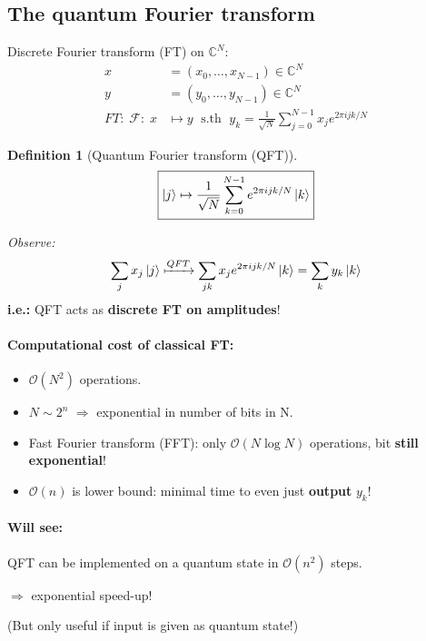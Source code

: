 \documentclass[a4paper, 12pt]{article}
\theoremstyle{plain}
\theoremstyle{definition}
\newtheorem*{definition}{Definition}
\theoremstyle{remark}
\begin{document}
\subsection{The quantum Fourier transform}

Discrete Fourier transform (FT) on $\mathbb{C}^N$:
\begin{align*}
  x&=(x_0,\ldots,x_{N-1}) \in \mathbb{C}^N \\
  y&=(y_0,\ldots,y_{N-1}) \in \mathbb{C}^N\\
  FT:\;\mathcal{F}:\;x &\mapsto y\; \text{ s.th }\; y_k = \frac{1}{\sqrt{N}}\sum_{j=0}^{N-1}x_je^{2\pi ijk/N}
\end{align*}
\begin{definition}[Quantum Fourier transform (QFT)]
  \begin{equation*}
    \boxed{\ket{j} \mapsto \frac{1}{\sqrt{N}}\sum_{k=0}^{N-1}e^{2\pi ijk/N}\ket{k}}
  \end{equation*}

\end{definition}
\emph{Observe:}
\begin{equation*}
  \sum_j x_j \ket{j} \xmapsto{QFT} \sum_{jk} x_j e^{2\pi ijk/N}\ket{k} = \sum_k y_k \ket{k}
\end{equation*}
\textbf{i.e.:} QFT acts as \textbf{discrete FT on amplitudes}!

\paragraph{Computational cost of classical FT:}
\begin{itemize}
  \item $\mathcal{O}(N^2)$ operations.
  \item $N \sim 2^n$ $\Longrightarrow$ exponential in number of bits in N.
  \item Fast Fourier transform (FFT): only $\mathcal{O}(N\log N)$ operations, bit \textbf{still exponential}!
  \item $\mathcal{O}(n)$ is lower bound: minimal time to even just \textbf{output} $y_k$!
\end{itemize}

\paragraph{Will see:} QFT can be implemented on a quantum state in $\mathcal{O}(n^2)$ steps.

\begin{center}
  $\Longrightarrow$ exponential speed-up!

  (But only useful if input is given as quantum state!)
\end{center}
\end{document}
